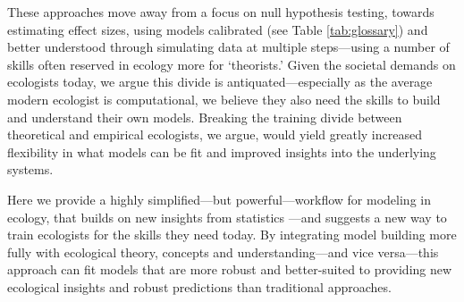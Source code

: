 \documentclass[11pt]{article}
\begin{document}
{These approaches move away from a focus on null hypothesis testing, towards estimating effect sizes, using models calibrated (see Table \ref{tab:glossary}) and better understood through simulating data at multiple steps---using a number of skills often reserved in ecology more for `theorists.' Given the societal demands on ecologists today, we argue this divide is antiquated---especially as the average modern ecologist is computational, we believe they also need the skills to build and understand their own models. Breaking the training divide between theoretical and empirical ecologists, we argue, would yield greatly increased flexibility in what models can be fit and improved insights into the underlying systems.

Here we provide a highly simplified---but powerful---workflow for modeling in ecology, that builds on new insights from statistics  \citep{betanworkflow,vandeschoot2021}---and suggests a new way to train ecologists for the skills they need today. By integrating model building more fully with ecological theory, concepts and understanding---and vice versa---this approach can fit models that are more robust and better-suited to providing new ecological insights and robust predictions than traditional approaches. 

}
\end{document}
